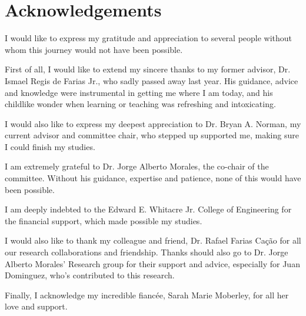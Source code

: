 \documentclass{aux/ttuthes2007}
\begin{document}
\frontmatter


\chapter{\textbf{Acknowledgements}}
I would like to express my gratitude and appreciation to several people without whom this journey would not have been possible.

First of all, I would like to extend my sincere thanks to my former advisor, Dr. Ismael Regis de Farias Jr., who sadly passed away last year. 
His guidance, advice and knowledge were instrumental in getting me where I am today, and his childlike wonder when learning or teaching was refreshing and intoxicating.

I would also like to express my deepest appreciation to Dr. Bryan A. Norman, my current advisor and committee chair, who stepped up supported me, making sure I could finish my studies.

I am extremely grateful to Dr. Jorge Alberto Morales, the co-chair of the committee. Without his guidance, expertise and patience, none of this would have been possible.

I am deeply indebted to the Edward E. Whitacre Jr. College of Engineering for the financial support, which made possible my studies.

I would also like to thank my colleague and friend, Dr. Rafael Farias Ca\c{c}\~{a}o for all our research collaborations and friendship. Thanks should also go to Dr. Jorge Alberto Morales' Research group for their support and advice, especially for Juan Dominguez, who's contributed to this research.

Finally, I acknowledge my incredible fianc\'{e}e, Sarah Marie Moberley, for all her love and support.



\tableofcontents	%

\end{document}
